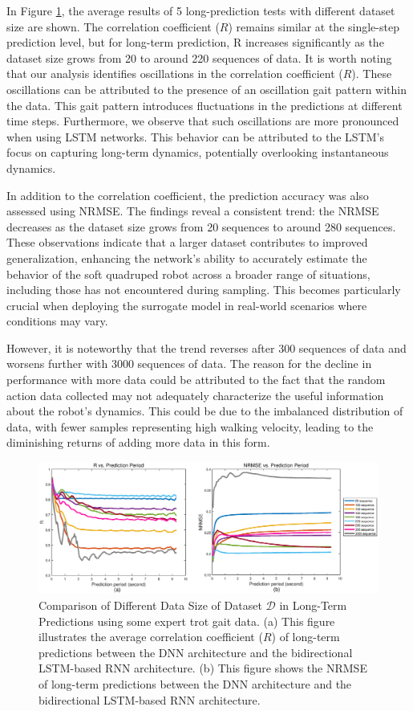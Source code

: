 In Figure \ref{fig:datasize}, the average results of 5 long-prediction tests with different dataset size are shown. The correlation coefficient ($R$) remains similar at the single-step prediction level, but for long-term prediction, R increases significantly as the dataset size grows from 20 to around 220 sequences of data. It is worth noting that our analysis identifies oscillations in the correlation coefficient ($R$). These oscillations can be attributed to the presence of an oscillation gait pattern within the data. This gait pattern introduces fluctuations in the predictions at different time steps. Furthermore, we observe that such oscillations are more pronounced when using LSTM networks. This behavior can be attributed to the LSTM's focus on capturing long-term dynamics, potentially overlooking instantaneous dynamics.

In addition to the correlation coefficient, the prediction accuracy was also assessed using \ac{NRMSE}. The findings reveal a consistent trend: the NRMSE decreases as the dataset size grows from 20 sequences to around 280 sequences. These observations indicate that a larger dataset contributes to improved generalization, enhancing the network's ability to accurately estimate the behavior of the soft quadruped robot across a broader range of situations, including those has not encountered during sampling. This becomes particularly crucial when deploying the surrogate model in real-world scenarios where conditions may vary.

However, it is noteworthy that the trend reverses after 300 sequences of data and worsens further with 3000 sequences of data. The reason for the decline in performance with more data could be attributed to the fact that the random action data collected may not adequately characterize the useful information about the robot's dynamics. This could be due to the imbalanced distribution of data, with fewer samples representing high walking velocity, leading to the diminishing returns of adding more data in this form.
\begin{figure}[htb]
    \centering
    \includegraphics[width=\linewidth]{img/chap4/datasize.eps}
    \caption{Comparison of Different Data Size of Dataset $\mathcal{D}$ in Long-Term Predictions using some expert trot gait data. (a) This figure illustrates the average correlation coefficient ($R$) of long-term predictions between the DNN architecture and the bidirectional LSTM-based RNN architecture. (b) This figure shows the \ac{NRMSE} of long-term predictions between the DNN architecture and the bidirectional LSTM-based RNN architecture.}
    \label{fig:datasize}
\end{figure}

